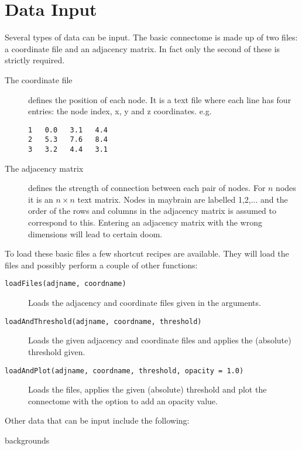 \documentclass{report}
\begin{document}
\section{Data Input}
Several types of data can be input. The basic connectome is made up of two files: a coordinate file and an adjacency matrix. In fact only the second of these is strictly required. %

\begin{description}
\item[{The coordinate file}] defines the position of each node. It is a text file where each line has four entries: the node index, x, y and z coordinates. e.g.

\begin{verbatim}
1   0.0   3.1   4.4
2   5.3   7.6   8.4
3   3.2   4.4   3.1
\end{verbatim}

\item[{The adjacency matrix}] defines the strength of connection between each pair of nodes. For $n$ nodes it is an $n \times n$ text matrix. Nodes in maybrain are labelled 1,2,... and the order of the rows and columns in the adjacency matrix is assumed to correspond to this. Entering an adjacency matrix with the wrong dimensions will lead to certain doom. %
\end{description}
    
To load these basic files a few shortcut recipes are available. They will load the files and possibly perform a couple of other functions:

\begin{description}
\item[\texttt{loadFiles(adjname, coordname)}] Loads the adjacency and coordinate files given in the arguments.

\item[\texttt{loadAndThreshold(adjname, coordname, threshold)}] Loads the given adjacency and coordinate files and applies the (absolute) threshold given.

\item[\texttt{loadAndPlot(adjname, coordname, threshold, opacity = 1.0)}] Loads the files, applies the given (absolute) threshold and plot the connectome with the option to add an opacity value.
\end{description}

Other data that can be input include the following: 

backgrounds
\end{document}
